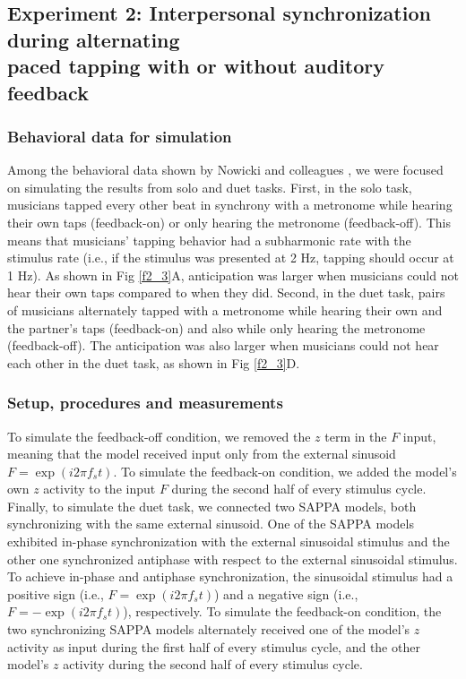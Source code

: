 \documentclass{report}
\begin{document}
\subsection{Experiment 2: Interpersonal synchronization during alternating \\ paced tapping with or without auditory feedback}

\subsubsection{Behavioral data for simulation}

Among the behavioral data shown by Nowicki and colleagues \cite{nowicki2013mutual}, we were focused on simulating the results from solo and duet tasks. First, in the solo task, musicians tapped every other beat in synchrony with a metronome while hearing their own taps (feedback-on) or only hearing the metronome (feedback-off). This means that musicians' tapping behavior had a subharmonic rate with the stimulus rate (i.e., if the stimulus was presented at 2 Hz, tapping should occur at 1 Hz). As shown in Fig \ref{f2_3}A, anticipation was larger when musicians could not hear their own taps compared to when they did. Second, in the duet task, pairs of musicians alternately tapped with a metronome while hearing their own and the partner's taps (feedback-on) and also while only hearing the metronome (feedback-off). The anticipation was also larger when musicians could not hear each other in the duet task, as shown in Fig \ref{f2_3}D.

\subsubsection{Setup, procedures and measurements}

To simulate the feedback-off condition, we removed the $z$ term in the $F$ input, meaning that the model received input only from the external sinusoid $F = \exp(i2\pi f_s t)$. To simulate the feedback-on condition, we added the model's own $z$ activity to the input $F$ during the second half of every stimulus cycle. Finally, to simulate the duet task, we connected two SAPPA models, both synchronizing with the same external sinusoid. One of the SAPPA models exhibited in-phase synchronization with the external sinusoidal stimulus and the other one synchronized antiphase with respect to the external sinusoidal stimulus. To achieve in-phase and antiphase synchronization, the sinusoidal stimulus had a positive sign (i.e., $F = \exp(i2\pi f_s t)$) and a negative sign (i.e., $F = -\exp(i2\pi f_s t)$), respectively. To simulate the feedback-on condition, the two synchronizing SAPPA models alternately received one of the model's $z$ activity as input during the first half of every stimulus cycle, and the other model's $z$ activity during the second half of every stimulus cycle.
\end{document}
